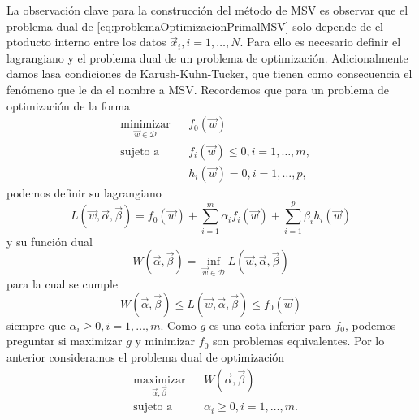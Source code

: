 \documentclass[letterpaper,12pt]{book}
\begin{document}
La observación clave para la construcción del método de MSV es observar que el problema dual de \ref{eq:problemaOptimizacionPrimalMSV} solo depende de el ptoducto interno entre los datos $\vec{x}_i, i = 1,\dots,N$. Para ello es necesario definir el lagrangiano y el problema dual de un problema de optimización. Adicionalmente damos lasa condiciones de Karush-Kuhn-Tucker, que tienen como consecuencia el fenómeno que le da el nombre a MSV. Recordemos que para un  problema de optimización de la forma 
\begin{equation}\label{eq:problemaDeOptimizacionGeneral}
  \begin{aligned}
    & \underset{\vec{w}\in\mathcal{D}}{\text{minimizar}}
    & & f_0(\vec{w})\\
    & \text{sujeto a}
    & & f_i(\vec{w}) \leq 0 , i = 1,\dots,m,\\
    & & & h_i(\vec{w}) = 0, i = 1, \dots, p,
  \end{aligned}
\end{equation}
podemos definir su lagrangiano 
\begin{equation}
  L(\vec{w}, \vec{\alpha}, \vec{\beta}) = f_0(\vec{w}) + \sum_{i=1}^{m}\alpha_if_i(\vec{w}) + \sum_{i=1}^{p}\beta_ih_i(\vec{w})
\end{equation}
y su función dual 
\begin{equation}
  W(\vec{\alpha}, \vec{\beta}) = \inf_{\vec{w}\in\mathcal{D}}L(\vec{w}, \vec{\alpha}, \vec{\beta})
\end{equation}
para la cual se cumple
\begin{equation}
  W(\vec{\alpha}, \vec{\beta}) \leq L(\vec{w}, \vec{\alpha}, \vec{\beta}) \leq f_0(\vec{w})
\end{equation}
siempre que $\alpha_i\geq 0, i = 1,\dots, m$. Como $g$ es una cota inferior para $f_0$, podemos preguntar si maximizar $g$ y minimizar $f_0$ son problemas equivalentes. Por lo anterior consideramos el problema dual de optimización
\begin{equation}\label{eq:problemaOptimizacionDualGeneral}
  \begin{aligned}
    & \underset{\vec{\alpha},\vec{\beta}}{\text{maximizar}}
    & & W(\vec{\alpha}, \vec{\beta})\\
    & \text{sujeto a}
    & & \alpha_i \geq 0 , i = 1,\dots,m.
  \end{aligned}
\end{equation}
\end{document}
